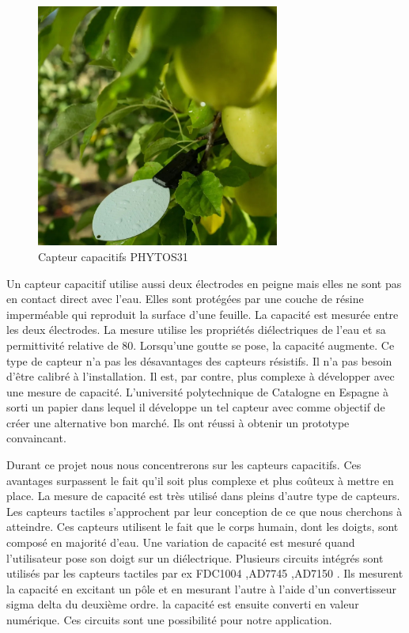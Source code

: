 \begin{figure}[!ht]
\centering
\includegraphics[width=8cm]{leaf-wetness-3}
\caption{Capteur capacitifs PHYTOS31 \cite{evvos}}
\end{figure}


Un capteur capacitif utilise aussi deux électrodes en peigne mais elles ne sont pas en contact direct avec l'eau. Elles sont protégées par une couche de résine imperméable qui reproduit la surface d'une feuille. La  capacité est mesurée entre les deux électrodes. La mesure utilise les propriétés diélectriques de l'eau et sa permittivité relative de 80. Lorsqu'une goutte se pose, la capacité augmente. Ce type de capteur n'a pas les désavantages des capteurs résistifs. Il n'a pas besoin d'être calibré à l'installation. Il est, par contre, plus complexe à développer avec une mesure de capacité. L'université polytechnique de Catalogne en Espagne à sorti un papier\cite{HORNERO2017286} dans lequel il développe un tel capteur avec comme objectif de créer une alternative bon marché. Ils ont réussi à obtenir un prototype convaincant.

Durant ce projet nous nous concentrerons sur les capteurs capacitifs. Ces avantages surpassent le fait qu'il soit plus complexe et plus coûteux à mettre en place. La mesure de capacité est très utilisé dans pleins d'autre type de capteurs. Les capteurs tactiles s’approchent par leur conception de ce que nous cherchons à atteindre. Ces capteurs utilisent le fait que le corps humain, dont les doigts, sont composé en majorité d'eau. Une variation de capacité est mesuré quand l'utilisateur pose son doigt sur un diélectrique. Plusieurs circuits intégrés sont utilisés par les capteurs tactiles par ex FDC1004 \cite{fdc1004},AD7745 \cite{ad7745},AD7150 \cite{ad7150}. Ils mesurent la capacité en excitant un pôle et en mesurant l'autre à l'aide d'un convertisseur sigma delta du deuxième ordre. la capacité est ensuite converti en valeur numérique. Ces circuits sont une possibilité pour notre application.
